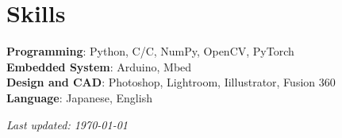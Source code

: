 \documentclass[letterpaper,11pt]{article}
\begin{document}
\section{Skills}
\small{
    \textbf{Programming}: Python, C/{C\nolinebreak[4]\hspace{-.05em}\raisebox{.4ex}{\tiny\bf ++}}, NumPy, OpenCV, PyTorch \\
    \textbf{Embedded System}: Arduino, Mbed \\
    \textbf{Design and CAD}: Photoshop, Lightroom, Iillustrator, Fusion 360 \\
    \textbf{Language}: Japanese, English  
}


\vspace{5pt}
\begin{flushright}
    {\small\textit{Last updated: \today}}
\end{flushright}
\end{document}
